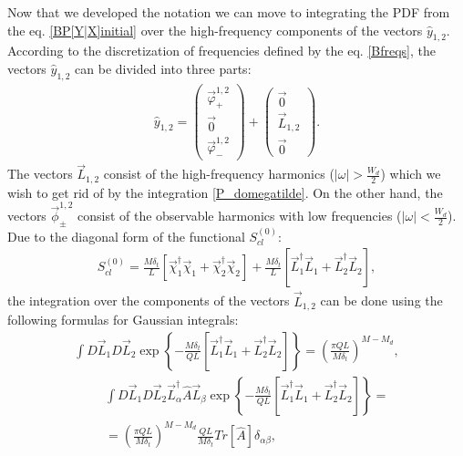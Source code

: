 \documentclass{article}
\begin{document}
Now that we developed the notation we can move to integrating the PDF from the eq. \eqref{BP[Y|X]initial} over the high-frequency components of the vectors $\hat{y}_{1,2}$. According to the discretization of frequencies defined by the eq. \eqref{Bfreqs}, the vectors $\hat{y}_{1,2}$ can be divided into three parts:
\begin{eqnarray}\label{Byvector}
    \hat{y}_{1,2} = 
    \begin{pmatrix}
    \vec{\varphi}_{+}^{1,2}\\
    \vec{0}\\
    \vec{\varphi}_{-}^{1,2}
    \end{pmatrix}
    + 
    \begin{pmatrix}
    \vec{0}\\
    \vec{L}_{1,2}\\
    \vec{0}
    \end{pmatrix}.
\end{eqnarray}
The vectors $\vec{L}_{1,2}$ consist of the high-frequency harmonics ($|\omega|>\frac{W_{d}}{2}$) which we wish to get rid of by the integration \eqref{P_domegatilde}. On the other hand, the vectors $\vec{\phi}_{\pm}^{1,2}$ consist of the observable harmonics with low frequencies ($|\omega|<\frac{W_{d}}{2}$). Due to the diagonal form of the functional $S_{cl}^{(0)}$: 
\begin{eqnarray}
    S_{cl}^{(0)} = \frac{M\delta_{t}}{L}\left[\vec{\chi}_{1}^{\dag}\vec{\chi}_{1} + \vec{\chi}_{2}^{\dag}\vec{\chi}_{2}\right] + \frac{M\delta_{t}}{L}\left[\vec{L}_{1}^{\dag}\vec{L}_{1} + \vec{L}_{2}^{\dag}\vec{L}_{2}\right],
\end{eqnarray}
the integration over the components of the vectors $\vec{L}_{1,2}$ can be done using the following formulas for Gaussian integrals:
\begin{eqnarray}\label{Lformula1}
    \!\!\!\int D\vec{L}_{1}D\vec{L}_{2} \exp\left\{-\frac{M\delta_{t}}{QL}\left[\vec{L}_{1}^{\dag}\vec{L}_{1} + \vec{L}_{2}^{\dag}\vec{L}_{2}\right]\right\} = \left(\frac{\pi Q L}{M \delta_{t}}\right)^{M-M_{d}}, 
\end{eqnarray}
\begin{eqnarray}\label{Lformula2}
  &&\int D\vec{L}_{1}D\vec{L}_{2} \vec{L}_{\alpha}^{\dag} \hat{A} \vec{L}_{\beta} \exp\left\{-\frac{M\delta_{t}}{QL}\left[\vec{L}_{1}^{\dag}\vec{L}_{1} + \vec{L}_{2}^{\dag}\vec{L}_{2}\right]\right\} =  \nonumber\\
  &&= \left(\frac{\pi Q L}{M \delta_{t}}\right)^{M-M_{d}}\frac{QL}{M\delta_{t}}Tr[\hat{A}] \delta_{\alpha \beta},
\end{eqnarray}
\end{document}
